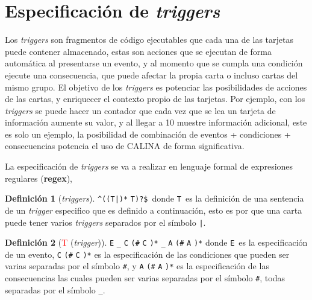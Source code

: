 \section{Especificación de \textit{triggers}}
\label{sec:app_triggers}

Los \textit{triggers} son fragmentos de código ejecutables que cada una de las tarjetas puede contener 
almacenado, estas son acciones que se ejecutan de forma automática al presentarse un evento, y al momento que 
se cumpla una condición ejecute una consecuencia, que puede afectar la propia carta o incluso cartas del mismo 
grupo. El objetivo de los \textit{triggers} es potenciar las posibilidades de acciones de las cartas, y 
enriquecer el contexto propio de las tarjetas. Por ejemplo, con los \textit{triggers} se puede hacer un 
contador que cada vez que se lea un tarjeta de información aumente su valor, y al llegar a 10 muestre 
información adicional, este es solo un ejemplo, la posibilidad de combinación de eventos + condiciones + 
consecuencias potencia el uso de CALINA de forma significativa.

La especificación de \textit{triggers} se va a realizar en lenguaje formal de expresiones regulares 
(\textbf{regex}),

\theoremstyle{definition}
\newtheorem{definition}{Definición}[section]

\begin{definition}[\textit{triggers}]
	{\Large\color{blue}\verb/^((/}{\Large\color{red}\verb/T/}{\Large\color{blue}\verb/|)*/}
	{\Large\color{red}\verb/T/}{\Large\color{blue}\verb/)?$/}\ donde {\Large\color{red}\verb/T/}\ es la 
	definición de una sentencia de un \textit{trigger} especifico que es definido a continuación, esto es 
	por que una carta puede tener varios \textit{triggers} separados por el símbolo 
	{\Large\color{blue}\verb/|/}.
\end{definition}

\begin{definition}[\textcolor{red}{T} (\textit{trigger})]
	{\Large\color{red} \verb/E/}{\Large\color{blue} \verb/_/}{\Large\color{red} \verb/C/}{\Large\color{blue} \verb/(#/}{\Large\color{red} \verb/C/}{\Large\color{blue} \verb/)*/}{\Large\color{blue} \verb/_/}{\Large\color{red} \verb/A/}{\Large\color{blue} \verb/(#/}{\Large\color{red} \verb/A/}{\Large\color{blue} \verb/)*/}
	donde {\Large\color{red}\verb/E/}\ es la especificación de un evento, {\Large\color{red} \verb/C/}{\Large\color{blue} \verb/(#/}{\Large\color{red} \verb/C/}{\Large\color{blue} \verb/)*/}
	es la especificación de las condiciones que pueden ser varias separadas por el símbolo 
	{\Large\color{blue}\verb/#/}, y {\Large\color{red} \verb/A/}{\Large\color{blue} \verb/(#/}{\Large\color{red} \verb/A/}{\Large\color{blue} \verb/)*/} 
	es la especificación de las consecuencias las cuales pueden ser varias separadas por el símbolo 
	{\Large\color{blue}\verb/#/}, todas separadas por el símbolo {\Large\color{blue}\verb/_/}.
\end{definition}

